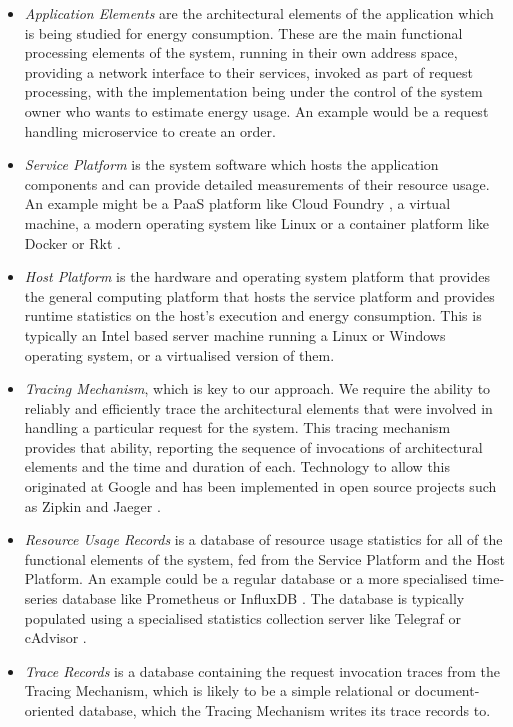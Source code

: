 \begin{itemize}
\item \emph{Application Elements} are the architectural elements of the application which is being studied for energy consumption.  These are the main functional processing elements of the system, running in their own address space, providing a network interface to their services, invoked as part of request processing, with the implementation being under the control of the system owner who wants to estimate energy usage.  An example would be a request handling microservice to create an order.
\item \emph{Service Platform} is the system software which hosts the application components and can provide detailed measurements of their resource usage.  An example might be a PaaS platform like Cloud Foundry \cite{cloudfoundry2018}, a virtual machine, a modern operating system like Linux or a container platform like Docker \cite{docker2018} or Rkt \cite{rkt2018}.
\item \emph{Host Platform} is the hardware and operating system platform that provides the general computing platform that hosts the service platform and provides runtime statistics on the host's execution and energy consumption.  This is typically an Intel based server machine running a Linux or Windows operating system, or a virtualised version of them.
\item \emph{Tracing Mechanism}, which is key to our approach.  We require the ability to reliably and efficiently trace the architectural elements that were involved in handling a particular request for the system.  This tracing mechanism provides that ability, reporting the sequence of invocations of architectural elements and the time and duration of each.  Technology to allow this originated at Google \cite{sigelman2010-dapper} and has been implemented in open source projects such as Zipkin \cite{zipkin2018} and Jaeger \cite{jaeger2018}.
\item \emph{Resource Usage Records} is a database of resource usage statistics for all of the functional elements of the system, fed from the Service Platform and the Host Platform.  An example could be a regular database or a more specialised time-series database like Prometheus \cite{prometheus2018} or InfluxDB \cite{influxdb2018}.  The database is typically populated using a specialised statistics collection server like Telegraf \cite{telegraf2018} or cAdvisor \cite{cadvisor2018}.
\item \emph{Trace Records} is a database containing the request invocation traces from the Tracing Mechanism, which is likely to be a simple relational or document-oriented database, which the Tracing Mechanism writes its trace records to.

\end{itemize}
